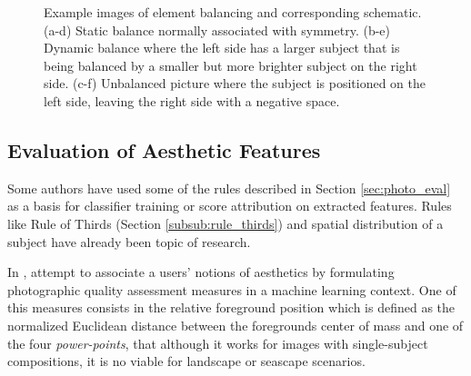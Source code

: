 \begin{figure}[htbp]
        \centering
  \caption{Example images of element balancing and corresponding schematic. (a-d) Static balance normally associated with symmetry. (b-e) Dynamic balance where the left side has a larger subject that is being balanced by a smaller but more brighter subject on the right side. (c-f) Unbalanced picture where the subject is positioned on the left side, leaving the right side with a negative space.}
  \label{fig:balance_elements_image}
\end{figure}

\subsection{Evaluation of Aesthetic Features}
\label{subsub:eval_features}

Some authors have used some of the rules described in Section \ref{sec:photo_eval} as a basis for classifier training or score attribution on extracted features.
Rules like Rule of Thirds (Section \ref{subsub:rule_thirds}) and spatial distribution of a subject have already been topic of research.

In \cite{bhattacharya2010framework}, \citeauthor{bhattacharya2010framework} attempt to associate a users' notions of aesthetics by formulating photographic quality assessment measures in a machine learning context. One of this measures consists in the relative foreground position which is defined as the normalized Euclidean distance between the foregrounds center of mass and one of the four \emph{power-points}, that although it works for images with single-subject compositions, it is no viable for landscape or seascape scenarios.

